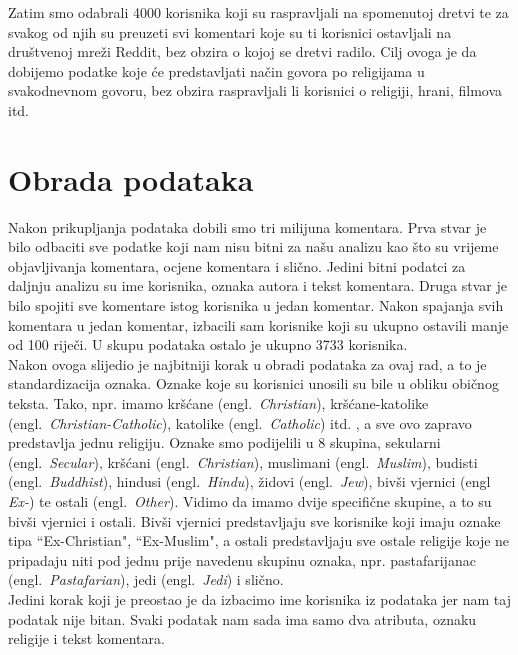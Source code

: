 \documentclass[times,utf8,zavrsni]{fer}
\begin{document}
Zatim smo odabrali 4000 korisnika koji su raspravljali na spomenutoj dretvi te za svakog od njih su preuzeti svi komentari koje su ti korisnici ostavljali na društvenoj mreži Reddit, bez obzira o kojoj se dretvi radilo. Cilj ovoga je da dobijemo podatke koje će predstavljati način govora po religijama u svakodnevnom govoru, bez obzira raspravljali li korisnici o religiji, hrani, filmova itd. \\

\newpage
\section{Obrada podataka}
Nakon prikupljanja podataka dobili smo tri milijuna komentara. Prva stvar je bilo odbaciti sve podatke koji nam nisu bitni za našu analizu kao što su vrijeme objavljivanja komentara, ocjene komentara i slično. Jedini bitni podatci za daljnju analizu su ime korisnika, oznaka autora i tekst komentara. Druga stvar je bilo spojiti sve komentare istog korisnika u jedan komentar. Nakon spajanja svih komentara u jedan komentar, izbacili sam korisnike koji su ukupno ostavili manje od 100 riječi. U skupu podataka ostalo je ukupno 3733 korisnika. \\

Nakon ovoga slijedio je najbitniji korak u obradi podataka za ovaj rad, a to je standardizacija oznaka. Oznake koje su korisnici unosili su bile u obliku običnog teksta. Tako, npr. imamo kršćane (engl.~\emph{Christian}), kršćane-katolike (engl.~\emph{Christian-Catholic}), katolike (engl.~\emph{Catholic}) itd. , a sve ovo zapravo predstavlja jednu religiju. Oznake smo podijelili u 8 skupina,  sekularni (engl.~\emph{Secular}), kršćani (engl.~\emph{Christian}), muslimani (engl.~\emph{Muslim}), budisti (engl.~\emph{Buddhist}), hindusi (engl.~\emph{Hindu}), židovi (engl.~\emph{Jew}), bivši vjernici (engl \emph{Ex-}) te ostali (engl.~\emph{Other}). Vidimo da imamo dvije specifične skupine, a to su bivši vjernici i ostali. Bivši vjernici predstavljaju sve korisnike koji imaju oznake tipa ``Ex-Christian", ``Ex-Muslim", a ostali predstavljaju sve ostale religije koje ne pripadaju niti pod jednu prije navedenu skupinu oznaka, npr. pastafarijanac (engl.~\emph{Pastafarian}), jedi (engl.~\emph{Jedi}) i slično. \\

Jedini korak koji je preostao je da izbacimo ime korisnika iz podataka jer nam taj podatak nije bitan. Svaki podatak nam sada ima samo dva atributa, oznaku religije i tekst komentara. \\
\end{document}
